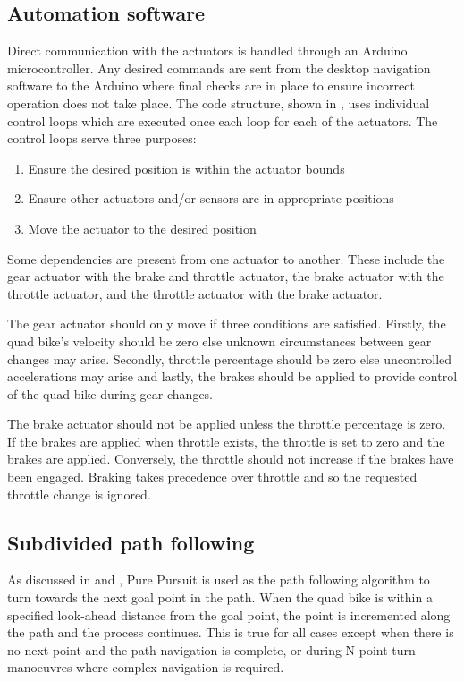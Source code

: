 \documentclass[main.tex]{subfiles}
\begin{document}
\subsection{Automation software}
Direct communication with the actuators is handled through an Arduino microcontroller. Any desired commands are sent from the desktop navigation software to the Arduino where final checks are in place to ensure incorrect operation does not take place. The code structure, shown in , uses individual control loops which are executed once each loop for each of the actuators. The control loops serve three purposes:
\begin{enumerate}
\item Ensure the desired position is within the actuator bounds
\item Ensure other actuators and/or sensors are in appropriate positions
\item Move the actuator to the desired position
\end{enumerate}
Some dependencies are present from one actuator to another. These include the gear actuator with the brake and throttle actuator, the brake actuator with the throttle actuator, and the throttle actuator with the brake actuator.

The gear actuator should only move if three conditions are satisfied. Firstly, the quad bike's velocity should be zero else unknown circumstances between gear changes may arise. Secondly, throttle percentage should be zero else uncontrolled accelerations may arise and lastly, the brakes should be applied to provide control of the quad bike during gear changes.

The brake actuator should not be applied unless the throttle percentage is zero. If the brakes are applied when throttle exists, the throttle is set to zero and the brakes are applied. Conversely, the throttle should not increase if the brakes have been engaged. Braking takes precedence over throttle and so the requested throttle change is ignored.

\subsection{Subdivided path following}
As discussed in  and , Pure Pursuit is used as the path following algorithm to turn towards the next goal point in the path. When the quad bike is within a specified look-ahead distance from the goal point, the point is incremented along the path and the process continues. This is true for all cases except when there is no next point and the path navigation is complete, or during N-point turn manoeuvres where complex navigation is required.
\end{document}
